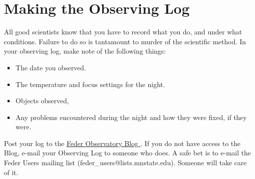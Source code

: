 \documentclass[letterpaper, 12pt]{report}
\begin{document}
\newpage

\chapter{Making the Observing Log}\label{ch:log}
All good scientists know that you have to record what you do, and under what conditions. Failure to do so is tantamount to murder of the scientific method. In your observing log, make note of the following things:
\begin{itemize}
	\item The date you observed.
	\item The temperature and focus settings for the night.
	\item Objects observed,
	\item Any problems encountered during the night and how they were fixed, if they were.
\end{itemize}

Post your log to the \href{(http://astronomy.mnstate.edu/Feder_Observatory/}{Feder Observatory Blog }. If you do not have access to the Blog, e-mail your Observing Log to someone who does. A safe bet is to e-mail the Feder Users mailing list (feder\_users@lists.mnstate.edu). Someone will take care of it.

\newpage
\end{document}
